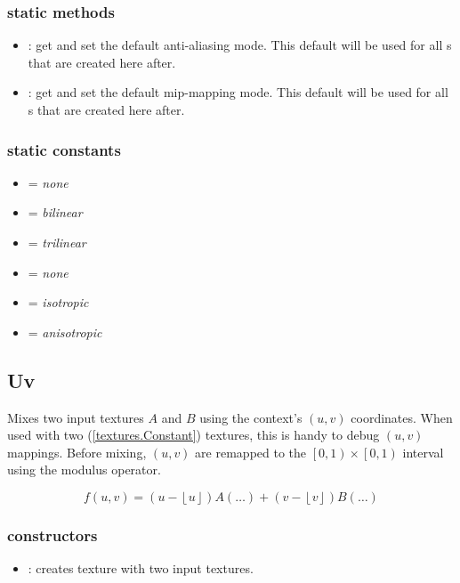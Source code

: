 \subsubsection*{static methods}
\begin{itemize}
	\item {}: 
		get and set the default anti-aliasing mode.  This default will be used for all s that are created here after.
	\item {}: 
		get and set the default mip-mapping mode.  This default will be used for all s that are created here after.
\end{itemize}

\subsubsection*{static constants}
\begin{itemize}
	\item {} = \emph{none}
	\item {} = \emph{bilinear}
	\item {} = \emph{trilinear}
	\item {} = \emph{none}
	\item {} = \emph{isotropic}
	\item {} = \emph{anisotropic}
\end{itemize}





\subsection{Uv}

Mixes two input textures $A$ and $B$ using the context's $\left(u, v\right)$ coordinates.  When used with two (\ref{textures.Constant}) textures, this is handy to debug $\left(u, v\right)$ mappings.  Before mixing, $\left(u, v\right)$ are remapped to the $\left[0, 1\right) \times \left[0, 1\right)$ interval using the modulus operator.  

\begin{equation}
	f\left(u, v\right) = 
		\left(u - \left\lfloor u \right\rfloor\right) A\left(\ldots\right) +
		\left(v - \left\lfloor v \right\rfloor\right) B\left(\ldots\right)
\end{equation}

\subsubsection*{constructors}
\begin{itemize}
	\item {}:
		creates  texture with two input textures.
\end{itemize}

